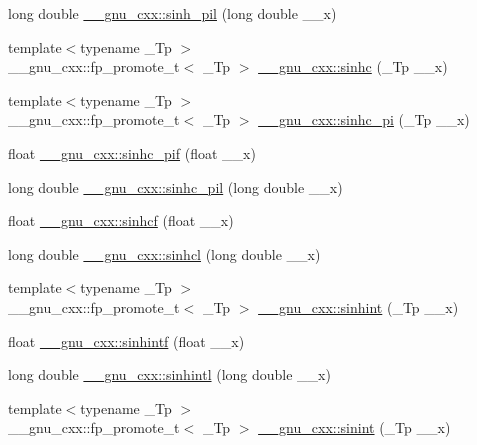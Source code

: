 \begin{DoxyCompactItemize}
\item 
long double \hyperlink{group__mathsf__gnu_ga2232ee554ef2a902824db42e2e09c483}{\+\_\+\+\_\+gnu\+\_\+cxx\+::sinh\+\_\+pil} (long double \+\_\+\+\_\+x)
\item 
{\footnotesize template$<$typename \+\_\+\+Tp $>$ }\\\+\_\+\+\_\+gnu\+\_\+cxx\+::fp\+\_\+promote\+\_\+t$<$ \+\_\+\+Tp $>$ \hyperlink{group__mathsf__gnu_gaf2f02e4143e7beb97352cef4b7fcb663}{\+\_\+\+\_\+gnu\+\_\+cxx\+::sinhc} (\+\_\+\+Tp \+\_\+\+\_\+x)
\item 
{\footnotesize template$<$typename \+\_\+\+Tp $>$ }\\\+\_\+\+\_\+gnu\+\_\+cxx\+::fp\+\_\+promote\+\_\+t$<$ \+\_\+\+Tp $>$ \hyperlink{group__mathsf__gnu_ga8bb6034e28d48879845bf64818cc06e1}{\+\_\+\+\_\+gnu\+\_\+cxx\+::sinhc\+\_\+pi} (\+\_\+\+Tp \+\_\+\+\_\+x)
\item 
float \hyperlink{group__mathsf__gnu_ga26e54504db6541550266140f5264acbe}{\+\_\+\+\_\+gnu\+\_\+cxx\+::sinhc\+\_\+pif} (float \+\_\+\+\_\+x)
\item 
long double \hyperlink{group__mathsf__gnu_gaa572bf7633f457c86cef65bfd6ec4ad9}{\+\_\+\+\_\+gnu\+\_\+cxx\+::sinhc\+\_\+pil} (long double \+\_\+\+\_\+x)
\item 
float \hyperlink{group__mathsf__gnu_gadaa7ea78625cc2eeb70213a50719813d}{\+\_\+\+\_\+gnu\+\_\+cxx\+::sinhcf} (float \+\_\+\+\_\+x)
\item 
long double \hyperlink{group__mathsf__gnu_ga7467a001bb18ef8bff0a7e9927bab356}{\+\_\+\+\_\+gnu\+\_\+cxx\+::sinhcl} (long double \+\_\+\+\_\+x)
\item 
{\footnotesize template$<$typename \+\_\+\+Tp $>$ }\\\+\_\+\+\_\+gnu\+\_\+cxx\+::fp\+\_\+promote\+\_\+t$<$ \+\_\+\+Tp $>$ \hyperlink{group__mathsf__gnu_gab5cbc831c5fab99a967c03d059f1ad59}{\+\_\+\+\_\+gnu\+\_\+cxx\+::sinhint} (\+\_\+\+Tp \+\_\+\+\_\+x)
\item 
float \hyperlink{group__mathsf__gnu_ga375ca3ceb1eafd678e298d0aea4bb3e6}{\+\_\+\+\_\+gnu\+\_\+cxx\+::sinhintf} (float \+\_\+\+\_\+x)
\item 
long double \hyperlink{group__mathsf__gnu_ga8b7f1a070be7233a3179e3cbded387ee}{\+\_\+\+\_\+gnu\+\_\+cxx\+::sinhintl} (long double \+\_\+\+\_\+x)
\item 
{\footnotesize template$<$typename \+\_\+\+Tp $>$ }\\\+\_\+\+\_\+gnu\+\_\+cxx\+::fp\+\_\+promote\+\_\+t$<$ \+\_\+\+Tp $>$ \hyperlink{group__mathsf__gnu_ga076c8d52588904f5711c41781f8acfa0}{\+\_\+\+\_\+gnu\+\_\+cxx\+::sinint} (\+\_\+\+Tp \+\_\+\+\_\+x)

\end{DoxyCompactItemize}
